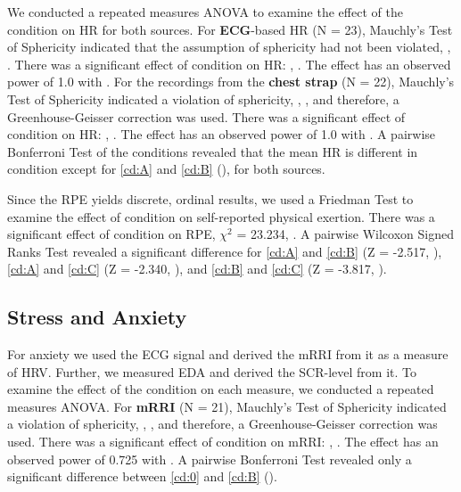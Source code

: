 

We conducted a repeated measures \gls{ANOVA} to examine the effect of the condition on \gls{HR} for both sources. For \textbf{\gls{ECG}}-based \gls{HR} (N = 23), Mauchly's Test of Sphericity indicated that the assumption of sphericity had not been violated, , . There was a significant effect of condition on \gls{HR}: , . The effect has an observed power of 1.0 with . For the recordings from the \textbf{chest strap} (N = 22), Mauchly's Test of Sphericity indicated a violation of sphericity, , , and therefore, a Greenhouse-Geisser correction was used. There was a significant effect of condition on \gls{HR}: , . The effect has an observed power of 1.0 with . A pairwise Bonferroni Test of the conditions revealed that the mean \gls{HR} is different in condition except for \ref{cd:A} and \ref{cd:B} (), for both sources.

Since the \gls{RPE} yields discrete, ordinal results, we used a Friedman Test to examine the effect of condition on self-reported physical exertion. There was a significant effect of condition on \gls{RPE}, $\chi^2$ = 23.234, . A pairwise Wilcoxon Signed Ranks Test revealed a significant difference for \ref{cd:A} and \ref{cd:B} (Z = -2.517, ), \ref{cd:A} and \ref{cd:C} (Z = -2.340, ), and \ref{cd:B} and \ref{cd:C} (Z = -3.817, ).

\subsection{Stress and Anxiety}

For anxiety we used the \gls{ECG} signal and derived the \gls{mRRI} from it as a measure of \gls{HRV}. Further, we measured \gls{EDA} and derived the \gls{SCR}-level from it. To examine the effect of the condition on each measure, we conducted a repeated measures \gls{ANOVA}. For \textbf{\gls{mRRI}} (N = 21), Mauchly's Test of Sphericity indicated a violation of sphericity, , , and therefore, a Greenhouse-Geisser correction was used. There was a significant effect of condition on \gls{mRRI}: , . The effect has an observed power of 0.725 with . A pairwise Bonferroni Test revealed only a significant difference between \ref{cd:0} and \ref{cd:B} ().

